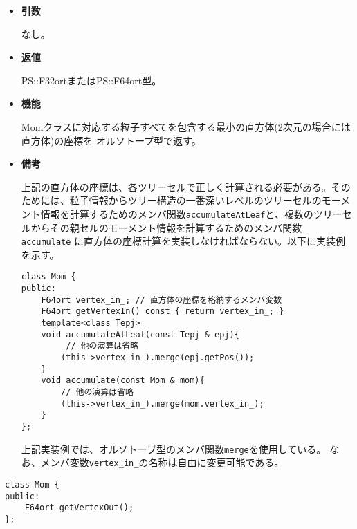 \begin{itemize}

\item {\bf 引数}

  なし。
  
\item {\bf 返値}

  PS::F32ortまたはPS::F64ort型。

\item {\bf 機能}

  Momクラスに対応する粒子すべてを包含する最小の直方体(2次元の場合には直方体)の座標を
  オルソトープ型で返す。

\item {\bf 備考}
  
上記の直方体の座標は、各ツリーセルで正しく計算される必要がある。そのためには、粒子情報からツリー構造の一番深いレベルのツリーセルのモーメント情報を計算するためのメンバ関数\texttt{accumulateAtLeaf}と、複数のツリーセルからその親セルのモーメント情報を計算するためのメンバ関数 \texttt{accumulate} に直方体の座標計算を実装しなければならない。以下に実装例を示す。 
  
\begin{screen}
\begin{verbatim}
class Mom {
public:
    F64ort vertex_in_; // 直方体の座標を格納するメンバ変数
    F64ort getVertexIn() const { return vertex_in_; }
    template<class Tepj>
    void accumulateAtLeaf(const Tepj & epj){ 
         // 他の演算は省略
        (this->vertex_in_).merge(epj.getPos());
    }
    void accumulate(const Mom & mom){
        // 他の演算は省略
        (this->vertex_in_).merge(mom.vertex_in_);
    }
};
\end{verbatim}
\end{screen}
上記実装例では、オルソトープ型のメンバ関数\texttt{merge}を使用している。
なお、メンバ変数\texttt{vertex\_in\_}の名称は自由に変更可能である。
  
\end{itemize}


\begin{screen}
\begin{verbatim}
class Mom {
public:
    F64ort getVertexOut();
};
\end{verbatim}
\end{screen}

